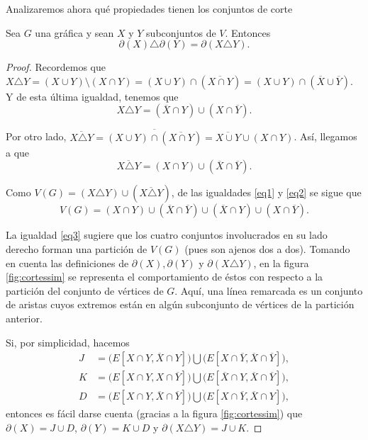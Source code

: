 Analizaremos ahora qué propiedades tienen los conjuntos de corte
\begin{teo}\label{teo:diferenciasimetricacortes}
Sea $G$ una gráfica y sean $X$ y $Y$ subconjuntos de $V$. Entonces $$\partial(X) \triangle \partial(Y) = \partial(X \triangle Y).$$
\end{teo}

\begin{proof}
Recordemos que $X \triangle Y = (X \cup Y)\setminus(X \cap Y) = (X \cup Y) \cap (\overline{X \cap Y}) = (X \cup Y) \cap (\overline{X} \cup \overline{Y})$. Y de esta última igualdad, tenemos que 
\begin{equation} \label{eq1}
    X \triangle Y = (\overline{X}\cap Y) \cup (X \cap \overline{Y}).
\end{equation}

Por otro lado, $\overline{X \triangle Y}=\overline{(X \cup Y) \cap (\overline{X \cap Y})}= \overline{X \cup Y} \cup (X \cap Y)$. Así, llegamos a que
\begin{equation} \label{eq2}
   \overline{X \triangle Y} = (X \cap Y) \cup (\overline{X} \cap \overline{Y}).
\end{equation}

Como $V(G)=(X \triangle Y) \cup (\overline{X \triangle Y})$, de las igualdades \ref{eq1} y \ref{eq2} se sigue que 
\begin{equation} \label{eq3}
    V(G) = (X \cap Y) \cup (\overline{X} \cap \overline{Y}) \cup (\overline{X} \cap Y) \cup (X \cap \overline{Y}).
\end{equation}

La igualdad \ref{eq3} sugiere que los cuatro conjuntos involucrados en su lado derecho forman una partición de $V(G)$ (pues son ajenos dos a dos). Tomando en cuenta las definiciones de $\partial(X), \partial(Y)$ y  $\partial(X \triangle Y)$, en la figura \ref{fig:cortessim} se representa el comportamiento de éstos con respecto a la partición del conjunto de vértices de $G$. Aquí, una línea remarcada es un conjunto de aristas cuyos extremos están en algún subconjunto de vértices de la partición anterior.

Si, por simplicidad, hacemos 
\begin{align*}
    J &= \big ( E[X \cap Y, \overline{X} \cap Y] \big ) \bigcup \big(E[X \cap \overline{Y}, \overline{X} \cap \overline{Y}]\big), \\
    K &= \big(E[X \cap Y, X \cap \overline{Y}]\big) \bigcup \big(E[\overline{X} \cap Y, \overline{X} \cap \overline{Y}]\big), \\
    D &= \big(E[X \cap Y, \overline{X} \cap \overline{Y}]) \bigcup (E[X \cap \overline{Y}, \overline{X} \cap Y]\big),
\end{align*}
entonces es fácil darse cuenta (gracias a la figura \ref{fig:cortessim}) que $\partial(X)= J \cup D$, $ \partial(Y)= K \cup D$ y $\partial(X \triangle Y)= J \cup K.$


\end{proof}
